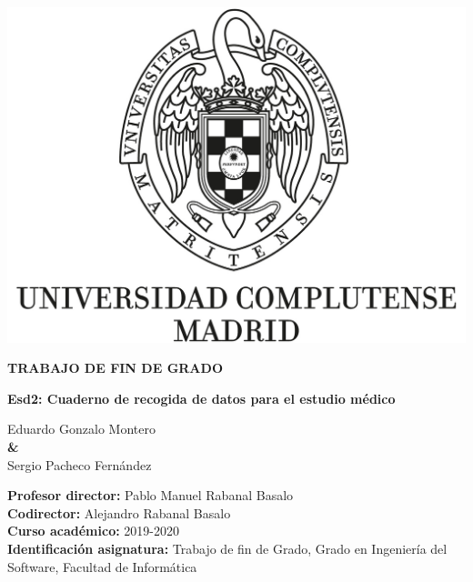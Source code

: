 \documentclass{report}
\begin{document}
    \begin{titlepage}
        \centering
        {\includegraphics[width=1\textwidth]{images/logo_UCM}}
    
        \vspace{1cm}
        
        {\huge\textbf{TRABAJO DE FIN DE GRADO \\ }  }

        \vspace{0.5cm}
        
        {\huge\textbf{Esd2: Cuaderno de recogida de datos para el estudio médico}}
        
        \vspace{1.4cm}
    
        {\Large Eduardo Gonzalo Montero \\}
        \vspace{0.5cm}
        {\textbf \&\\}
        \vspace{0.5cm}
        {\Large Sergio Pacheco Fernández \\}
        
        \vspace{1.4cm}
        
        \raggedright
        {\Large \textbf{Profesor director:} Pablo Manuel Rabanal Basalo \\}
        \vspace{0.1cm}
        {\Large \textbf{Codirector:} Alejandro Rabanal Basalo \\}
        \vspace{0.1cm}
        {\Large\textbf {Curso académico:} 2019-2020 \\}
        \vspace{0.1cm}
        {\Large\textbf {Identificación asignatura: }Trabajo de fin de Grado, Grado en Ingeniería del Software, Facultad de Informática \\}
   

\end{titlepage}
\end{document}
